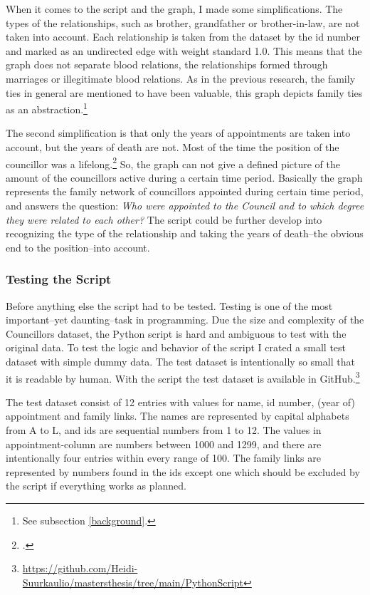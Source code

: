 When it comes to the script and the graph, I made some simplifications. The types of the relationships, such as brother, grandfather or brother-in-law, are not taken into account. Each relationship is taken from the dataset by the id number and marked as an undirected edge with weight standard 1.0. This means that the graph does not separate blood relations, the relationships formed through marriages or illegitimate blood relations. As in the previous research, the family ties in general are mentioned to have been valuable, this graph depicts family ties as an abstraction.\footnote{See subsection \ref{background}.} 

The second simplification is that only the years of appointments are taken into account, but the years of death are not. Most of the time the position of the councillor was a lifelong.\footcite[p. 52.]{HakanenAKoskinen2017} So, the graph can not give a defined picture of the amount of the councillors active during a certain time period. Basically the graph represents the family network of councillors appointed during certain time period, and answers the question: \textit{Who were appointed to the Council and to which degree they were related to each other?} The script could be further develop into recognizing the type of the relationship and taking the years of death–the obvious end to the position–into account.

\subsubsection{Testing the Script}
Before anything else the script had to be tested. Testing is one of the most important–yet daunting–task in programming. Due the size and complexity of the Councillors dataset, the Python script is hard and ambiguous to test with the original data. To test the logic and behavior of the script I crated a small test dataset with simple dummy data. The test dataset is intentionally so small that it is readable by human. With the script the test dataset is available in GitHub.\footnote{\url{https://github.com/Heidi-Suurkaulio/mastersthesis/tree/main/PythonScript}} 

The test dataset consist of 12 entries with values for name, id number, (year of) appointment and family links. The names are represented by capital alphabets from A to L, and ids are sequential numbers from 1 to 12. The values in appointment-column are numbers between 1000 and 1299, and there are intentionally four entries within every range of 100. The family links are represented by numbers found in the ids except one which should be excluded by the script if everything works as planned. 

